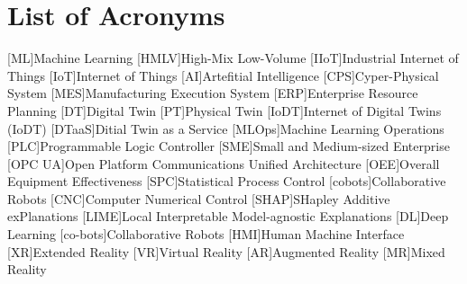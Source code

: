 
\chapter*{List of Acronyms}\label{chap:abbrev}

\begin{acronym}[ML] %
    [ML]{Machine Learning}
    [HMLV]{High-Mix Low-Volume}
    [IIoT]{Industrial Internet of Things}
    [IoT]{Internet of Things}
    [AI]{Artefitial Intelligence}
    [CPS]{Cyper-Physical System}
    [MES]{Manufacturing Execution System}
    [ERP]{Enterprise Resource Planning}
    [DT]{Digital Twin}
    [PT]{Physical Twin}
    [IoDT]{Internet of Digital Twins (IoDT)}
    [DTaaS]{Ditial Twin as a Service}
    [MLOps]{Machine Learning Operations}
    [PLC]{Programmable Logic Controller}
    [SME]{Small and Medium-sized Enterprise}
    [OPC UA]{Open Platform Communications Unified Architecture}
    [OEE]{Overall Equipment Effectiveness}
    [SPC]{Statistical Process Control}
    [cobots]{Collaborative Robots}
    [CNC]{Computer Numerical Control}
    [SHAP]{SHapley Additive exPlanations}
    [LIME]{Local Interpretable Model-agnostic Explanations}
    [DL]{Deep Learning}
    [co-bots]{Collaborative Robots}
    [HMI]{Human Machine Interface}
    [XR]{Extended Reality}
    [VR]{Virtual Reality}
    [AR]{Augmented Reality}
    [MR]{Mixed Reality}
\end{acronym}
